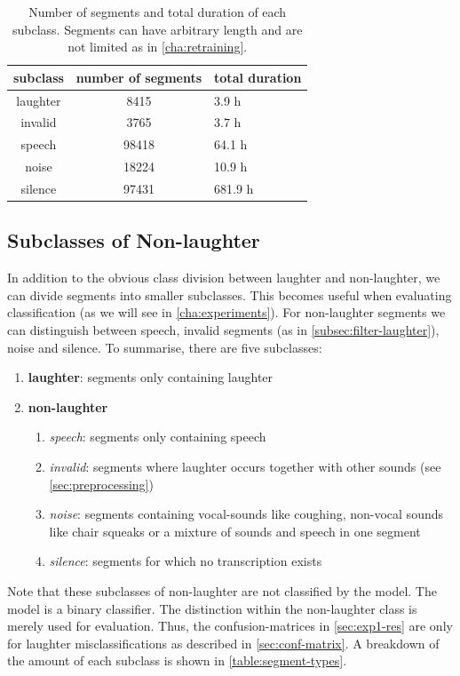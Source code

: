 \documentclass[bsc,frontabs,parskip,deptreport]{infthesis}
\begin{document}
\begin{table}[h!]
\begin{tabular}{c|c|l}
     subclass & number of segments & total duration \\
     \hline
     laughter & 8415 & 3.9 h \\ 
     invalid & 3765 & 3.7 h \\
     speech & 98418 & 64.1 h \\
     noise & 18224 & 10.9 h \\
     silence & 97431 & 681.9 h 
\end{tabular}
\centering
\caption{Number of segments and total duration of each subclass. Segments can have arbitrary length and are not limited as in \autoref{cha:retraining}.}
\label{table:segment-types}
\end{table}

\subsection{Subclasses of Non-laughter}
In addition to the obvious class division between laughter and non-laughter, we can divide segments into smaller subclasses. This becomes useful when evaluating classification (as we will see in \autoref{cha:experiments}).
For non-laughter segments we can distinguish between speech, invalid segments (as in \autoref{subsec:filter-laughter}), noise and silence.
To summarise, there are five subclasses:
\begin{enumerate}
    \item \textbf{laughter}: segments only containing laughter
    \item \textbf{non-laughter}
    \begin{enumerate}
        \item \textit{speech}: segments only containing speech
        \item \textit{invalid}: segments where laughter occurs together with other sounds (see \autoref{sec:preprocessing})
        \item \textit{noise}: segments containing vocal-sounds like coughing, non-vocal sounds like chair squeaks or a mixture of sounds and speech in one segment
        \item \textit{silence}: segments for which no transcription exists
    \end{enumerate}
\end{enumerate}
Note that these subclasses of non-laughter are not classified by the model. The model is a binary classifier. The distinction within the non-laughter class is merely used for evaluation.
Thus, the confusion-matrices in \autoref{sec:exp1-res} are only for laughter misclassifications as described in \autoref{sec:conf-matrix}.
A breakdown of the amount of each subclass is shown in \autoref{table:segment-types}.
\end{document}
